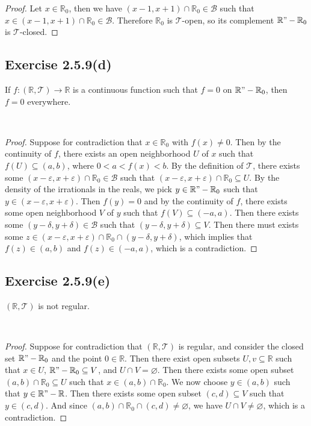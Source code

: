 \documentclass[12pt]{article}
\newenvironment{problem}
    {\begin{lrbox}{\mybox}\begin{minipage}{\textwidth-10pt}}
    {\end{minipage}\end{lrbox}\framebox[6.5in]{\usebox{\mybox}}\\}
\newcommand{\R}{\mathbb{R}}
\let\eps\varepsilon
\let\emptyset\varnothing
\newcommand{\T}{\mathscr{T}}
\newcommand{\B}{\mathscr{B}}
\begin{document}
\begin{proof}
    Let $x\in\R_0$, then we have $(x-1,x+1)\cap\R_0\in\B$ such that $x\in(x-1,x+1)\cap\R_0\in\B$. Therefore $\R_0$ is $\T$-open, so its complement $\R"-\R_0$ is $\T$-closed.
    
\end{proof}

\subsection*{Exercise 2.5.9(d)}
\begin{problem}
    If $f:(\R,\T)\to\R$ is a continuous function such that $f=0$ on $\R"-\R_0$, then $f=0$ everywhere.
\end{problem}

\begin{proof}
    Suppose for contradiction that $x\in\R_0$ with $f(x)\ne0$. Then by the continuity of $f$, there exists an open neighborhood $U$ of $x$ such that $f(U)\subseteq (a,b)$, where $0<a<f(x)<b$. By the definition of $\T$, there exists some $(x-\eps,x+\eps)\cap\R_0 \in \B$ such that $(x-\eps,x+\eps)\cap\R_0 \subseteq U$. By the density of the irrationals in the reals, we pick $y\in\R"-\R_0$ such that $y\in(x-\eps,x+\eps)$. Then $f(y)=0$ and by the continuity of $f$, there exists some open neighborhood $V$ of $y$ such that $f(V)\subseteq (-a,a)$. Then there exists some $(y-\delta,y+\delta)\in\B$ such that $(y-\delta,y+\delta)\subseteq V$. Then there must exists some $z\in(x-\eps,x+\eps)\cap\R_0 \cap(y-\delta,y+\delta)$, which implies that $f(z)\in(a,b)$ and $f(z)\in(-a,a)$, which is a contradiction.
\end{proof}

\subsection*{Exercise 2.5.9(e)}
\begin{problem}
    $(\R,\T)$ is not regular.
\end{problem}

\begin{proof}
    Suppose for contradiction that $(\R,\T)$ is regular, and consider the closed set $\R"-\R_0$ and the point $0\in\R$. Then there exist open subsets $U,v\subseteq\R$ such that $x\in U$, $\R"-\R_0\subseteq V$, and $U\cap V = \emptyset$. Then there exists some open subset $(a,b)\cap\R_0\subseteq U$ such that $x\in(a,b)\cap\R_0$. We now choose $y\in(a,b)$ such that $y\in\R"-\R$. Then there exists some open subset $(c,d)\subseteq V$ such that $y\in(c,d)$. And since $(a,b)\cap\R_0\cap(c,d)\ne\emptyset$, we have $U\cap V\ne \emptyset$, which is a contradiction.
    
\end{proof}
\end{document}
